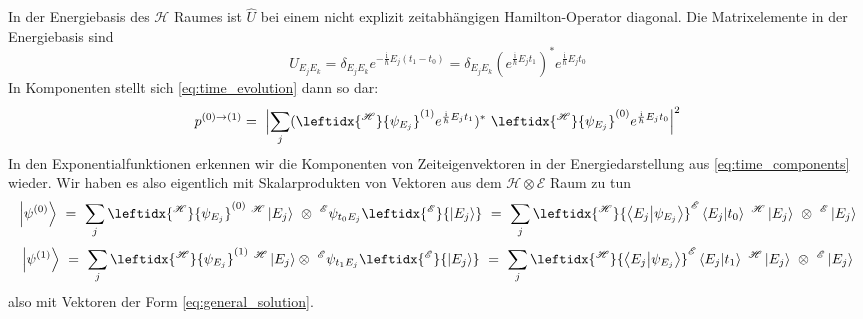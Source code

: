 \documentclass[12pt]{article}
\begin{document}
In der Energiebasis des $\mathscr{H}$ Raumes ist $\hat{U}$ bei einem nicht explizit zeitabhängigen Hamilton-Operator diagonal. Die Matrixelemente in der Energiebasis sind 
\begin{equation} 
U_{E_j E_k} = \delta_{E_j E_k} e^{-\frac{\mathrm{i}}{\hbar}E_j(t_1-t_0)}
= 
\delta_{E_j E_k}(e^{\frac{\mathrm{i}}{\hbar}E_j t_1})^* e^{\frac{\mathrm{i}}{\hbar}E_j t_0}
\end{equation}
In Komponenten stellt sich \eqref{eq:time_evolution} dann so dar:
\begin{equation} 
p^{(0)\rightarrow(1)} =\ 
\Bigl| \sum_j
(\leftidx{^\mathscr{H}}{\psi_{E_j}}^{(1)} e^{\frac{\mathrm{i}}{\hbar}E_j t_1})^*\ 
\leftidx{^\mathscr{H}}{\psi_{E_j}}^{(0)} e^{\frac{\mathrm{i}}{\hbar}E_j t_0}
\Bigr|^2
\end{equation}
In den Exponentialfunktionen erkennen wir die Komponenten von Zeiteigenvektoren in der Energiedarstellung aus \eqref{eq:time_components} wieder.
Wir haben es also eigentlich mit Skalarprodukten von Vektoren aus dem $\mathscr{H}\otimes\mathscr{E}$ Raum zu tun
\begin{equation*}
\ket{\psi^{(0)}}\ =\ \sum_j \leftidx{^\mathscr{H}}{\psi_{E_j}}^{(0)}\ ^\mathscr{H}\ket{E_j} 
\ \otimes\ ^\mathscr{E}\psi_{t_0 E_j} \leftidx{^\mathscr{E}}{\ket{E_j}}
\ =\ \sum_j \leftidx{^\mathscr{H}}{\bra{E_j}\ket{\psi_{E_j}}} ^\mathscr{E}\bra{E_j}\ket{t_0} \ ^\mathscr{H}\ket{E_j}\ \otimes\ ^\mathscr{E}\ket{E_j}
\end{equation*}
\begin{equation*}
\ket{\psi^{(1)}}\ =\ \sum_j \leftidx{^\mathscr{H}}{\psi_{E_j}}^{(1)}\ ^\mathscr{H}\ket{E_j} 
\otimes\ ^\mathscr{E}\psi_{t_1 E_j} \leftidx{^\mathscr{E}}{\ket{E_j}}
\ =\ \sum_j \leftidx{^\mathscr{H}}{\bra{E_j}\ket{\psi_{E_j}}} ^\mathscr{E}\bra{E_j}\ket{t_1} \ ^\mathscr{H}\ket{E_j}\ \otimes\ ^\mathscr{E}\ket{E_j} 
\end{equation*}
also mit Vektoren der Form \eqref{eq:general_solution}.


\end{document}

